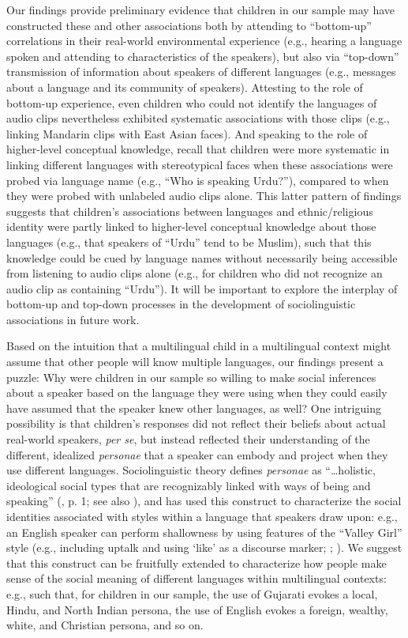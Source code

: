 \documentclass{foushee-adapted-preprint}
\begin{document}
Our findings provide preliminary evidence that children in our sample may have constructed these and other associations both by attending to ``bottom-up'' correlations in their real-world environmental experience (e.g., hearing a language spoken and attending to characteristics of the speakers), but also via ``top-down'' transmission of information about speakers of different languages (e.g., messages about a language and its community of speakers). Attesting to the role of bottom-up experience, even children who could not identify the languages of audio clips nevertheless exhibited systematic associations with those clips (e.g., linking Mandarin clips with East Asian faces). And speaking to the role of higher-level conceptual knowledge, recall that children were more systematic in linking different languages with stereotypical faces when these associations were probed via language name (e.g., ``Who is speaking Urdu?''), compared to when they were probed with unlabeled audio clips alone. This latter pattern of findings suggests that children's associations between languages and ethnic/religious identity were partly linked to higher-level conceptual knowledge about those languages (e.g., that speakers of ``Urdu'' tend to be Muslim), such that this knowledge could be cued by language names without necessarily being accessible from listening to audio clips alone (e.g., for children who did not recognize an audio clip as containing ``Urdu''). It will be important to explore the interplay of bottom-up and top-down processes in the development of sociolinguistic associations in future work.

Based on the intuition that a multilingual child in a multilingual context might assume that other people will know multiple languages, our findings present a puzzle: Why were children in our sample so willing to make social inferences about a speaker based on the language they were using when they could easily have assumed that the speaker knew other languages, as well? One intriguing possibility is that children's responses did not reflect their beliefs about actual real-world speakers, \textit{per se}, but instead reflected their understanding of the different, idealized \textit{personae} that a speaker can embody and project when they use different languages. Sociolinguistic theory defines \textit{personae} as ``\ldots holistic, ideological social types that are recognizably linked with ways of being and speaking'' (\cite{donofrio2020personae},  p. 1; see also \cite{d2016social}), and has used this construct to characterize the social identities associated with styles within a language that speakers draw upon: e.g., an English speaker can perform shallowness by using features of the ``Valley Girl'' style (e.g., including uptalk and using `like' as a discourse marker; \cite{pratt2017jaw}; \cite{d2015persona}). We suggest that this construct can be fruitfully extended to characterize how people make sense of the social meaning of different languages within multilingual contexts: e.g., such that, for children in our sample, the use of Gujarati evokes a local, Hindu, and North Indian persona, the use of English evokes a foreign, wealthy, white, and Christian persona, and so on. 
\end{document}
